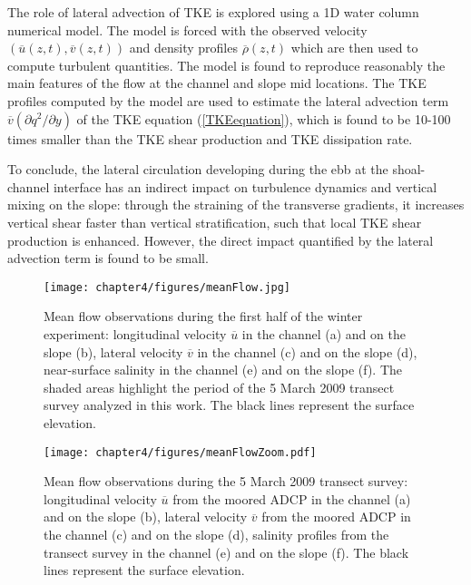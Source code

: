 The role of lateral advection of TKE is explored using a 1D water column numerical model. The model is forced with the observed velocity $(\overline{u}(z,t), \overline{v}(z,t))$ and density profiles $\overline{\rho}(z,t)$ which are then used to compute turbulent quantities. The model is found to reproduce reasonably the main features of the flow at the channel and slope mid locations. The TKE profiles computed by the model are used to estimate the lateral advection term $\overline{v}\left(\partial q^2 / \partial y \right)$ of the TKE equation (\ref{TKEequation}), which is found to be 10-100 times smaller than the TKE shear production and TKE dissipation rate. 

To conclude, the lateral circulation developing during the ebb at the shoal-channel interface has an indirect impact on turbulence dynamics and vertical mixing on the slope: through the straining of the transverse gradients, it increases vertical shear faster than vertical stratification, such that local TKE shear production is enhanced. However, the direct impact quantified by the lateral advection term is found to be small.



\begin{figure}[t]
  \noindent
  \texttt{[image: chapter4/figures/meanFlow.jpg]}\\
  \caption{Mean flow observations during the first half of the winter experiment: longitudinal velocity $\overline{u}$ in the channel (a) and on the slope (b), lateral velocity $\overline{v}$ in the channel (c) and on the slope (d), near-surface salinity in the channel (e) and on the slope (f). The shaded areas highlight the period of the 5 March 2009 transect survey analyzed in this work. The black lines represent the surface elevation.}
  \label{meanFlow}
\end{figure}

\begin{figure}[t]
  \noindent
  \texttt{[image: chapter4/figures/meanFlowZoom.pdf]}\\
  \caption{Mean flow observations during the 5 March 2009 transect survey: longitudinal velocity $\overline{u}$ from the moored ADCP in the channel (a) and on the slope (b), lateral velocity $\overline{v}$ from the moored ADCP in the channel (c) and on the slope (d), salinity profiles from the transect survey in the channel (e) and on the slope (f). The black lines represent the surface elevation.}
  \label{meanFlowZoom}
\end{figure}

